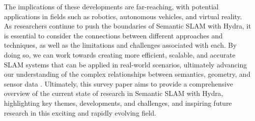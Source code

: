 \documentclass[conference]{IEEEtran}
\begin{document}
The implications of these developments are far-reaching, with potential applications in fields such as robotics, autonomous vehicles, and virtual reality. As researchers continue to push the boundaries of Semantic SLAM with Hydra, it is essential to consider the connections between different approaches and techniques, as well as the limitations and challenges associated with each. By doing so, we can work towards creating more efficient, scalable, and accurate SLAM systems that can be applied in real-world scenarios, ultimately advancing our understanding of the complex relationships between semantics, geometry, and sensor data \cite{b1}. Ultimately, this survey paper aims to provide a comprehensive overview of the current state of research in Semantic SLAM with Hydra, highlighting key themes, developments, and challenges, and inspiring future research in this exciting and rapidly evolving field.
\end{document}
